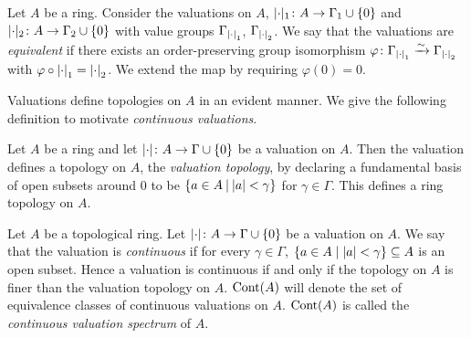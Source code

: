 \begin{definition}
Let $A$ be a ring.
Consider the valuations on $A$,
$\lvert\cdot\rvert_{1}\colon A\to\Gamma_{1}\cup\{0\}$ and 
$\lvert\cdot\rvert_{2}\colon A\to\Gamma_{2}\cup\{0\}$
with value groups 
$\Gamma_{{\lvert\cdot\rvert}_{1}}$, $\Gamma_{{\lvert\cdot\rvert}_{2}}$.
We say that the valuations are \emph{equivalent} if there exists an order-preserving group isomorphism $\varphi\colon\Gamma_{{\lvert\cdot\rvert}_{1}}\xrightarrow{\sim}\Gamma_{{\lvert\cdot\rvert}_{2}}$
with $\varphi\circ{\lvert\cdot\rvert}_{1} = {\lvert\cdot\rvert}_{2}$. We extend the map by requiring $\varphi(0)=0$.
\end{definition}


Valuations define topologies on $A$ in an evident manner. We give the following definition to motivate \emph{continuous valuations}.

\begin{definition}
Let $A$ be a ring and let $\lvert\cdot\rvert\colon A\to\Gamma\cup\{0\}$ be a valuation on $A$. Then the valuation defines a topology on $A$, the \emph{valuation topology},
by declaring a fundamental basis of open subsets around $0$ to be $\{a\in A\:\vert\: \lvert a\rvert<\gamma\}$ for $\gamma\in\Gamma$. This defines a ring topology on $A$.
\end{definition}
\begin{definition}
Let $A$ be a topological ring. Let $\lvert\cdot\rvert\colon A\to\Gamma\cup\{0\}$ be a valuation on $A$. We say that the valuation is \emph{continuous} if for every $\gamma\in\Gamma$,
$\{a\in A\mid \lvert a\rvert<\gamma\}\subseteq A$ is an open subset.
Hence a valuation is continuous if and only if the topology on $A$ is finer than the valuation topology on $A$.
${\mathrm{Cont}(A)}$ will denote the set of equivalence classes of continuous valuations on $A$. ${\mathrm{Cont}(A)}$ is called the \emph{continuous valuation spectrum} of $A$.
\end{definition}

